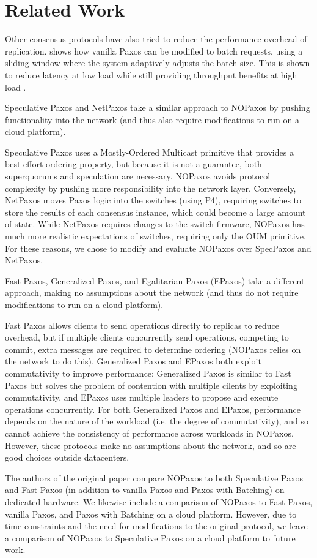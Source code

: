 \section{Related Work} \label{related}

Other consensus protocols have also tried to reduce the performance overhead of replication. \cite{pbft} shows how vanilla Paxos can be modified to batch requests, using a sliding-window where the system adaptively adjusts the batch size. This is shown to reduce latency at low load while still providing throughput benefits at high load \cite{pbft}.

Speculative Paxos\cite{specpaxos} and NetPaxos\cite{netpaxos} take a similar approach to NOPaxos by pushing functionality into the network (and thus also require modifications to run on a cloud platform).

Speculative Paxos uses a Mostly-Ordered Multicast primitive that provides a best-effort ordering property, but because it is not a guarantee, both superquorums and speculation are necessary. NOPaxos avoids protocol complexity by pushing more responsibility into the network layer. Conversely, NetPaxos moves Paxos logic into the switches (using P4), requiring switches to store the results of each consensus instance, which could become a large amount of state. While NetPaxos requires changes to the switch firmware, NOPaxos has much more realistic expectations of switches, requiring only the OUM primitive. For these reasons, we chose to modify and evaluate NOPaxos over SpecPaxos and NetPaxos. 

Fast Paxos\cite{fastpaxos}, Generalized Paxos\cite{generalizedpaxos}, and Egalitarian Paxos\cite{epaxos} (EPaxos) take a different approach, making no assumptions about the network (and thus do not require modifications to run on a cloud platform). 

Fast Paxos allows clients to send operations directly to replicas to reduce overhead, but if multiple clients concurrently send operations, competing to commit, extra messages are required to determine ordering (NOPaxos relies on the network to do this). Generalized Paxos and EPaxos both exploit commutativity to improve performance: Generalized Paxos is similar to Fast Paxos but solves the problem of contention with multiple cilents by exploiting commutativity, and EPaxos uses multiple leaders to propose and execute operations concurrently. For both Generalized Paxos and EPaxos, performance depends on the nature of the workload (i.e. the degree of commutativity), and so cannot achieve the consistency of performance across workloads in NOPaxos. However, these protocols make no assumptions about the network, and so are good choices outside datacenters. 

The authors of the original paper\cite{nopaxos} compare NOPaxos to both Speculative Paxos and Fast Paxos (in addition to vanilla Paxos and Paxos with Batching) on dedicated hardware. We likewise include a comparison of NOPaxos to Fast Paxos, vanilla Paxos, and Paxos with Batching on a cloud platform. However, due to time constraints and the need for modifications to the original protocol, we leave a comparison of NOPaxos to Speculative Paxos on a cloud platform to future work. 